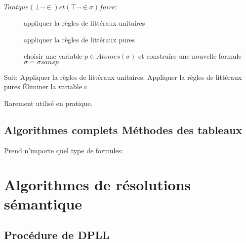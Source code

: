 $Tant que(\bot \neg \in) et (\top \neg \in \sigma) faire:$
\begin{description}
\item[] appliquer la règles de littéraux unitaires
\item[] appliquer la règles de littéraux pures
\item[] choisir une variable $p \in Atomes(\sigma)$ et construire une nouvelle formule $\sigma = \sigma sans p$
\end{description}

Soit:
Appliquer la règles de littéraux unitaires:
Appliquer la règles de littéraux pures
Éliminer la variable c

Rarement utilisé en pratique.

\section{Algorithmes complets Méthodes des tableaux}

Prend n'importe quel type de formules:\\


\chapter{Algorithmes de résolutions sémantique}

\section{Procédure de DPLL}




\pagebreak